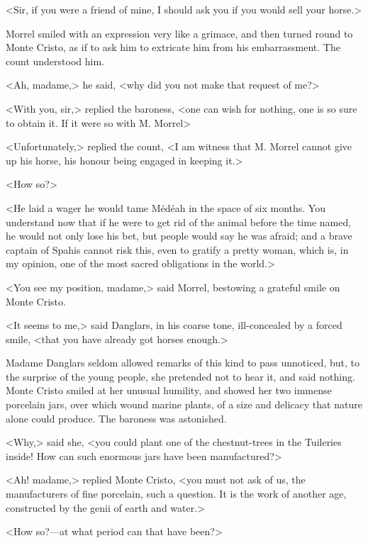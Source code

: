  <Sir, if you were a friend of mine, I should ask you if you would sell your horse.> 

 Morrel smiled with an expression very like a grimace, and then turned round to Monte Cristo, as if to ask him to extricate him from his embarrassment. The count understood him. 

 <Ah, madame,> he said, <why did you not make that request of me?> 

 <With you, sir,> replied the baroness, <one can wish for nothing, one is so sure to obtain it. If it were so with M. Morrel\longdash> 

 <Unfortunately,> replied the count, <I am witness that M. Morrel cannot give up his horse, his honour being engaged in keeping it.> 

 <How so?> 

 <He laid a wager he would tame Médéah in the space of six months. You understand now that if he were to get rid of the animal before the time named, he would not only lose his bet, but people would say he was afraid; and a brave captain of Spahis cannot risk this, even to gratify a pretty woman, which is, in my opinion, one of the most sacred obligations in the world.> 

 <You see my position, madame,> said Morrel, bestowing a grateful smile on Monte Cristo. 

 <It seems to me,> said Danglars, in his coarse tone, ill-concealed by a forced smile, <that you have already got horses enough.> 

 Madame Danglars seldom allowed remarks of this kind to pass unnoticed, but, to the surprise of the young people, she pretended not to hear it, and said nothing. Monte Cristo smiled at her unusual humility, and showed her two immense porcelain jars, over which wound marine plants, of a size and delicacy that nature alone could produce. The baroness was astonished. 

 <Why,> said she, <you could plant one of the chestnut-trees in the Tuileries inside! How can such enormous jars have been manufactured?> 

 <Ah! madame,> replied Monte Cristo, <you must not ask of us, the manufacturers of fine porcelain, such a question. It is the work of another age, constructed by the genii of earth and water.> 

 <How so?—at what period can that have been?> 

